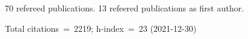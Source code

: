 70 refereed publications. 13 refeered publications as first author.

Total citations~=~2219; h-index~=~23 (2021-12-30)